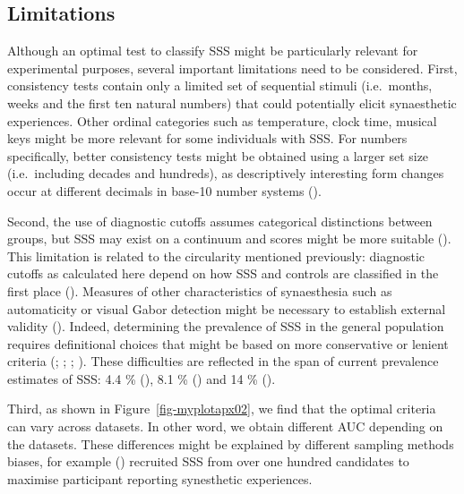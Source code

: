 \documentclass[
  man,
  longtable,
  a4paper,
  nolmodern,
  notxfonts,
  notimes,
  colorlinks=true,linkcolor=blue,citecolor=blue,urlcolor=blue]{apa7}
\begin{document}
\subsection{Limitations}\label{sec-limitations}

Although an optimal test to classify SSS might be particularly relevant
for experimental purposes, several important limitations need to be
considered. First, consistency tests contain only a limited set of
sequential stimuli (i.e.~months, weeks and the first ten natural
numbers) that could potentially elicit synaesthetic experiences. Other
ordinal categories such as temperature, clock time, musical keys might
be more relevant for some individuals with SSS. For numbers
specifically, better consistency tests might be obtained using a larger
set size (i.e.~including decades and hundreds), as descriptively
interesting form changes occur at different decimals in base-10 number
systems ().

Second, the use of diagnostic cutoffs assumes categorical distinctions
between groups, but SSS may exist on a continuum and scores might be
more suitable (). This
limitation is related to the circularity mentioned previously:
diagnostic cutoffs as calculated here depend on how SSS and controls are
classified in the first place ().
Measures of other characteristics of synaesthesia such as automaticity
or visual Gabor detection might be necessary to establish external
validity (). Indeed,
determining the prevalence of SSS in the general population requires
definitional choices that might be based on more conservative or lenient
criteria (;
;
;
). These difficulties are
reflected in the span of current prevalence estimates of SSS: 4.4 \%
(), 8.1 \%
() and 14 \%
().

Third, as shown in Figure~\ref{fig-myplotapx02}, we find that the
optimal criteria can vary across datasets. In other word, we obtain
different AUC depending on the datasets. These differences might be
explained by different sampling methods biases, for example
() recruited
SSS from over one hundred candidates to maximise participant reporting
synesthetic experiences.
\end{document}
